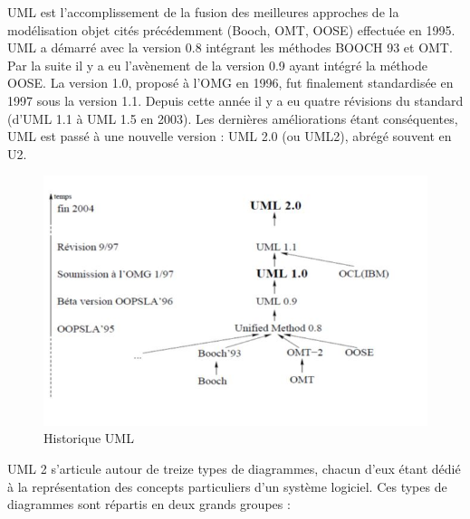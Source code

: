 \documentclass[a4paper, 12pt]{report}
\begin{document}
UML est l'accomplissement de la fusion des meilleures approches de la modélisation
objet cités précédemment (Booch, OMT, OOSE) effectuée en 1995. UML a démarré avec la version 0.8 intégrant
les méthodes BOOCH 93 et OMT. Par la suite il y a eu l’avènement de la version 0.9 ayant
intégré la méthode OOSE. La version 1.0, proposé à l’OMG en 1996, fut finalement
standardisée en 1997 sous la version 1.1. Depuis cette année il y a eu quatre révisions du
standard (d’UML 1.1 à UML 1.5 en 2003). Les dernières améliorations étant conséquentes,
UML est passé à une nouvelle version : UML 2.0 (ou UML2), abrégé souvent en U2.

\begin{figure}[H]
    \centering
    \includegraphics[width = 1\linewidth]{img/uml_historique.jpeg}
    \caption{Historique UML}
\end{figure}
UML 2 s’articule autour de treize types de diagrammes, chacun d’eux étant dédié à la
représentation des concepts particuliers d’un système logiciel. Ces types de diagrammes sont
répartis en deux grands groupes :
\end{document}
